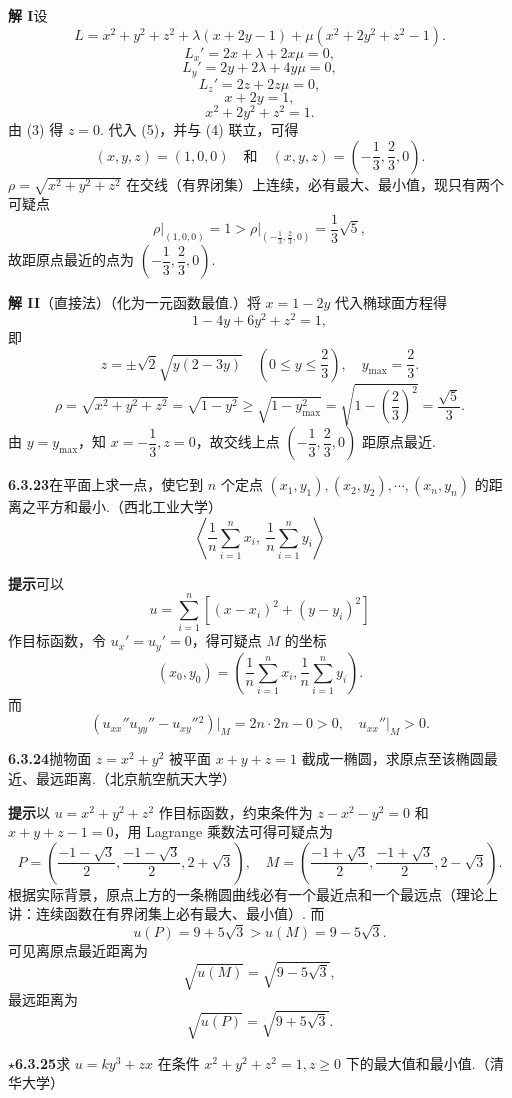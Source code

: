 \documentclass[UTF8, 12pt, fontset=fandol, oneside]{ctexart}
\begin{document}
\noindent\textbf{解 I}\quad 设
\[
  L=x^2+y^2+z^2+\lambda(x+2y-1)+\mu(x^2+2y^2+z^2-1).
\]
\[
  L_x'=2x+\lambda+2x\mu=0, \tag{1}
\]
\[
  L_y'=2y+2\lambda+4y\mu=0, \tag{2}
\]
\[
  L_z'=2z+2z\mu=0, \tag{3}
\]
\[
  x+2y=1, \tag{4}
\]
\[
  x^2+2y^2+z^2=1. \tag{5}
\]
由 (3) 得 $z=0$. 代入 (5)，并与 (4) 联立，可得
\[
  (x,y,z)=(1,0,0)\quad\text{和}\quad
  (x,y,z)=\left(-\frac13,\frac23,0\right).
\]
$\rho=\sqrt{x^2+y^2+z^2}$ 在交线（有界闭集）上连续，必有最大、最小值，现只有两个可疑点
\[
  \rho\big|_{(1,0,0)}=1>\rho\bigg|_{\left(-\frac13,\frac23,0\right)}
  =\frac13\sqrt5,
\]
故距原点最近的点为 $\left(-\dfrac13,\dfrac23,0\right)$.

\noindent\textbf{解 II}\quad （直接法）（化为一元函数最值.）将 $x=1-2y$ 代入椭球面方程得
\[
  1-4y+6y^2+z^2=1,
\]
即
\[
  z=\pm\sqrt2\sqrt{y(2-3y)}\quad
  \left(0\le y\le\frac23\right),\quad y_{\max}=\frac23.
\]
\[
  \rho=\sqrt{x^2+y^2+z^2}
  =\sqrt{1-y^2}\ge\sqrt{1-y_{\max}^2}
  =\sqrt{1-\left(\frac23\right)^2}=\frac{\sqrt5}{3}.
\]
由 $y=y_{\max}$，知 $x=-\dfrac13,z=0$，故交线上点 $\left(-\dfrac13,\dfrac23,0\right)$ 距原点最近.

\noindent\textbf{6.3.23}\quad 在平面上求一点，使它到 $n$ 个定点 $(x_1,y_1),(x_2,y_2),\cdots,(x_n,y_n)$ 的距离之平方和最小.（西北工业大学）
\[
  \left\langle
  \frac1n\sum_{i=1}^n x_i,\ \frac1n\sum_{i=1}^n y_i
  \right\rangle
\]

\noindent\textbf{提示}\quad 可以
\[
  u=\sum_{i=1}^n[(x-x_i)^2+(y-y_i)^2]
\]
作目标函数，令 $u_x'=u_y'=0$，得可疑点 $M$ 的坐标
\[
  (x_0,y_0)=\left(\frac1n\sum_{i=1}^n x_i,\frac1n\sum_{i=1}^n y_i\right).
\]
而
\[
  (u_{xx}''u_{yy}''-u_{xy}''{}^2)\big|_M=2n\cdot2n-0>0,\quad
  u_{xx}''\big|_M>0.
\]

\noindent\textbf{6.3.24}\quad 抛物面 $z=x^2+y^2$ 被平面 $x+y+z=1$ 截成一椭圆，求原点至该椭圆最近、最远距离.（北京航空航天大学）

\noindent\textbf{提示}\quad 以 $u=x^2+y^2+z^2$ 作目标函数，约束条件为 $z-x^2-y^2=0$ 和 $x+y+z-1=0$，用 Lagrange 乘数法可得可疑点为
\[
  P=\left(\frac{-1-\sqrt3}{2},\frac{-1-\sqrt3}{2},2+\sqrt3\right),
  \quad
  M=\left(\frac{-1+\sqrt3}{2},\frac{-1+\sqrt3}{2},2-\sqrt3\right).
\]
根据实际背景，原点上方的一条椭圆曲线必有一个最近点和一个最远点（理论上讲：连续函数在有界闭集上必有最大、最小值）. 而
\[
  u(P)=9+5\sqrt3>u(M)=9-5\sqrt3.
\]
可见离原点最近距离为
\[
  \sqrt{u(M)}=\sqrt{9-5\sqrt3},
\]
最远距离为
\[
  \sqrt{u(P)}=\sqrt{9+5\sqrt3}.
\]

\noindent\textbf{\ensuremath{\star}6.3.25}\quad 求 $u=ky^3+zx$ 在条件 $x^2+y^2+z^2=1,z\ge0$ 下的最大值和最小值.（清华大学）
\end{document}
